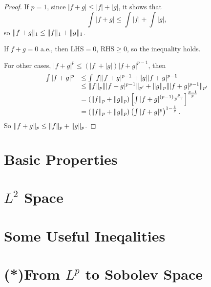 \begin{proof}
    If $p=1$, since $|f+g|\le|f|+|g|$, it shows that 
    \begin{displaymath}
        \int|f+g|\le\int|f|+\int|g|,
    \end{displaymath}
    so $\|f+g\|_{1}\le\|f\|_{1}+\|g\|_{1}$.

    If $f+g=0$ a.e., then LHS$=0$, RHS$\ge 0$, so the inequality 
    holds. 

    For other cases, $|f+g|^{p}\le(|f|+|g|)|f+g|^{p-1}$, then 
    \begin{displaymath}
        \begin{array}{rl}
            \int|f+g|^{p}&\le \int|f||f+g|^{p-1}+|g||f+g|^{p-1}\\
            &\le\|f\|_{p}\||f+g|^{p-1}\|_{p'}
            +\|g\|_{p}\||f+g|^{p-1}\|_{p'}\\
            &=(\|f\|_{p}+\|g\|_{p})
            \left[\int|f+g|^{(p-1)\frac{p}{p-1}}\right]
            ^{\frac{p-1}{p}}\\
            &=(\|f\|_{p}+\|g\|_{p})
            \left(\int|f+g|^{p}\right)^{1-\frac{1}{p}}.
        \end{array}
    \end{displaymath}
    So $\|f+g\|_{p}\le\|f\|_{p}+\|g\|_{p}$.
\end{proof}
\section{Basic Properties}
\section{$L^{2}$ Space}
\section{Some Useful Ineqalities}
\section{(*)From $L^{p}$ to Sobolev Space}